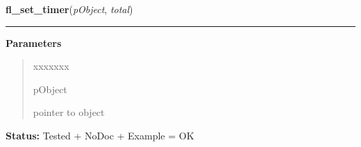     \label{xformslib:library:fl_set_timer}

    \vspace{0.5ex}

\hspace{.8\funcindent}\begin{boxedminipage}{\funcwidth}

    \raggedright \textbf{fl\_set\_timer}(\textit{pObject}, \textit{total})

    \vspace{-1.5ex}

    \rule{\textwidth}{0.5\fboxrule}
\setlength{\parskip}{2ex}
\setlength{\parskip}{1ex}
      \textbf{Parameters}
      \vspace{-1ex}

      \begin{quote}
        \begin{Ventry}{xxxxxxx}

          \item[pObject]

          pointer to object

        \end{Ventry}

      \end{quote}

\textbf{Status:} Tested + NoDoc + Example = OK



    \end{boxedminipage}

    \label{xformslib:library:fl_get_timer}

    \vspace{0.5ex}

